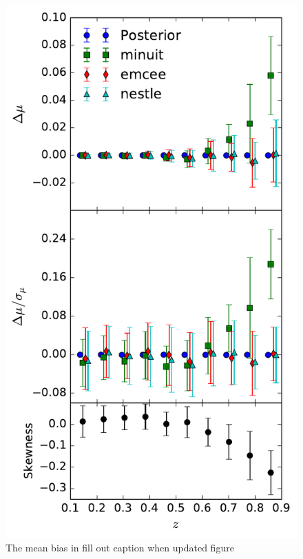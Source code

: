 \documentclass[a4paper,fleqn,usenatbib]{mnras}
\newcommand{\red}{\color{red}}
\begin{document}
\begin{figure}
	\includegraphics[width=\columnwidth]{../output/bias_dessky.pdf}
    \caption{The mean bias in {\red fill out caption when updated figure}}
    \label{fig:bias_des}
\end{figure}
\end{document}
